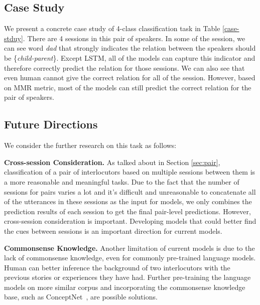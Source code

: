 \subsection{Case Study}
We present a concrete case study of 4-class classification task in Table \ref{case-stduy}. There are 4 sessions
in this pair of speakers. In some of the session, we can see word \textit{dad} that 
strongly indicates the relation between the speakers should be \{\textit{child-parent}\}.
Except LSTM, all of the models can capture this indicator and therefore correctly
predict the relation for those sessions. We can also see that even human cannot give the 
correct relation for all of the session. However, based on MMR metric, most of the models
can still predict the correct relation for the pair of speakers.



\subsection{Future Directions}

We consider the further research on this task as follows:

\textbf{Cross-session Consideration.} As talked about in Section \ref{sec:pair}, classification of a pair of interlocutors based on multiple sessions between them is a more reasonable and meaningful tasks. Due to the fact that the number of sessions for pairs varies a lot and it's difficult and unreasonable to concatenate all of the utterances in these sessions as the input for models, we only combines the prediction results of each session to get the final pair-level predictions. However, cross-session consideration is important. Developing models that could better find the cues between sessions is an important direction for current models.

\textbf{Commonsense Knowledge.} Another limitation of current models is due to the lack of commonsense knowledge, even for commonly pre-trained language models. Human can better inference the background of two interlocutors with the previous stories or experiences they have had. Further pre-training the language models on more similar corpus and incorporating the commonsense knowledge base, such as ConceptNet~\cite{SpeerCH17}, are possible solutions.